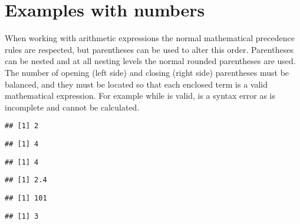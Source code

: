 \documentclass[paper=a4,headsepline,BCOR=12mm,twoside,open=right,%
titlepage,headings=small,fontsize=10pt,index=totoc,bibliography=totoc,%
captions=tableheading,captions=nooneline]{scrbook}\usepackage{knitr}
\begin{document}
\section{Examples with numbers}

When working with arithmetic expressions the normal mathematical precedence rules are respected, but parentheses can be used to alter this order. Parentheses can be nested and at all nesting levels the normal rounded parentheses are used. The number of opening (left side) and closing (right side) parentheses must be balanced, and they must be located so that each enclosed term is a valid mathematical expression. For example while  is valid,  is a syntax error as  is incomplete and cannot be calculated.

\begin{knitrout}\footnotesize
{}\color{fgcolor}\begin{kframe}
\begin{alltt}
 \hlopt{+} 
\end{alltt}
\begin{verbatim}
## [1] 2
\end{verbatim}
\begin{alltt}
 \hlopt{*} 
\end{alltt}
\begin{verbatim}
## [1] 4
\end{verbatim}
\begin{alltt}
 \hlopt{+}  \hlopt{/} 
\end{alltt}
\begin{verbatim}
## [1] 4
\end{verbatim}
\begin{alltt}
\hlstd{(} \hlopt{+} \hlstd{)} \hlopt{/} 
\end{alltt}
\begin{verbatim}
## [1] 2.4
\end{verbatim}
\begin{alltt}
\hlopt{^} \hlopt{+} 
\end{alltt}
\begin{verbatim}
## [1] 101
\end{verbatim}
\begin{alltt}
\hlstd{(}\hlstd{)}
\end{alltt}
\begin{verbatim}
## [1] 3
\end{verbatim}

\end{kframe}
\end{knitrout}
\end{document}
